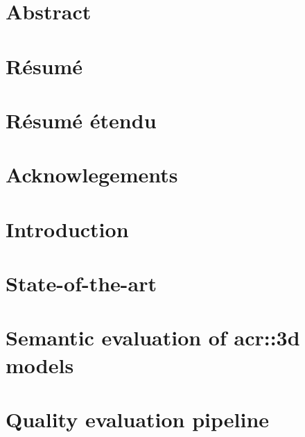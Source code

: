 \documentclass[12pt, twoside]{book}
\begin{document}
    \dominitoc
    \doparttoc
    \frontmatter
    \pagestyle{plain}
   
    
    
    \leftchapter
    \chapter{Abstract}
        
    \chapter{Résumé}
        
    \chapter{Résumé étendu}
        
    \chapter{Acknowlegements}
        

    \printglossary[type=\acronymtype]
    \printglossary

    \tableofcontents
    \listoffigures
    \listoftables
    \mtcaddchapter

    \mainmatter
    \rightchapter

    \chapter{Introduction}
        \label{chap::introduction}
        
   
    \chapter{State-of-the-art}
        

    \chapter{Semantic evaluation of \gls{acr::3d} models}
        

    \chapter{Quality evaluation pipeline}
        
\end{document}
